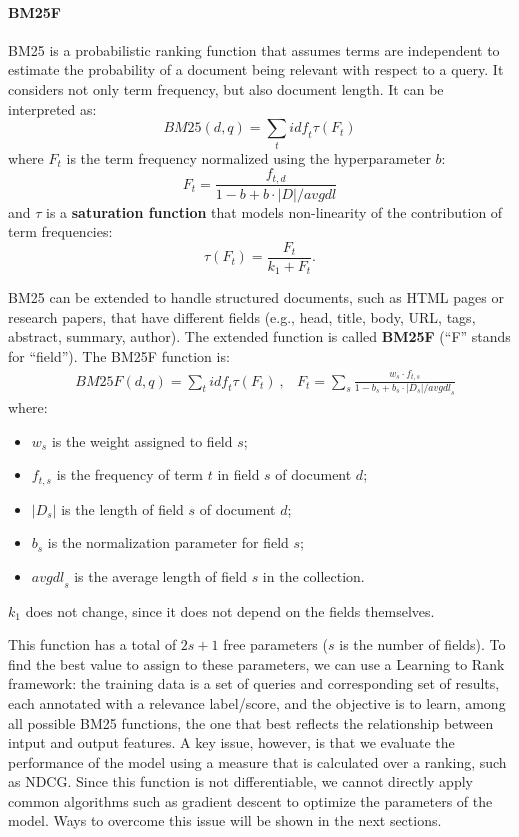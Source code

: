 \paragraph{BM25F}
BM25 is a probabilistic ranking function that assumes terms are independent to estimate the probability of a document being relevant with respect to a query. It considers not only term frequency, but also document length. It can be interpreted as:
\begin{equation*}
    \textit{BM25}(d,q) = \sum_t \textit{idf}_t \tau(F_t)
\end{equation*}
where $F_t$ is the term frequency normalized using the hyperparameter $b$:
\begin{equation*}
    F_t = \frac{f_{t,d}}{1 - b + b \cdot |D|/\textit{avgdl}}
\end{equation*}
and $\tau$ is a \textbf{saturation function} that models non-linearity of the contribution of term frequencies:
\begin{equation*}
    \tau(F_t) = \frac{F_t}{k_1 + F_t}.
\end{equation*}

BM25 can be extended to handle structured documents, such as HTML pages or research papers, that have different fields (e.g., head, title, body, URL, tags, abstract, summary, author). The extended function is called \textbf{BM25F} (``F'' stands for ``field''). The BM25F function is:
\begin{align*}
    &\textit{BM25F}(d,q) = \sum_t \textit{idf}_t \tau(F_t) \ , & F_t = \sum_s \frac{w_s \cdot f_{t,s}}{1 - b_s + b_s \cdot |D_s|/\textit{avgdl}_s}
\end{align*}
where:
\begin{itemize}[noitemsep]
    \item $w_s$ is the weight assigned to field $s$;
    \item $f_{t,s}$ is the frequency of term $t$ in field $s$ of document $d$;
    \item $|D_s|$ is the length of field $s$ of document $d$;
    \item $b_s$ is the normalization parameter for field $s$;
    \item $\textit{avgdl}_s$ is the average length of field $s$ in the collection.
\end{itemize}
$k_1$ does not change, since it does not depend on the fields themselves.

This function has a total of $2s + 1$ free parameters ($s$ is the number of fields). To find the best value to assign to these parameters, we can use a Learning to Rank framework: the training data is a set of queries and corresponding set of results, each annotated with a relevance label/score, and the objective is to learn, among all possible BM25 functions, the one that best reflects the relationship between intput and output features. A key issue, however, is that we evaluate the performance of the model using a measure that is calculated over a ranking, such as NDCG. Since this function is not differentiable, we cannot directly apply common algorithms such as gradient descent to optimize the parameters of the model. Ways to overcome this issue will be shown in the next sections.


